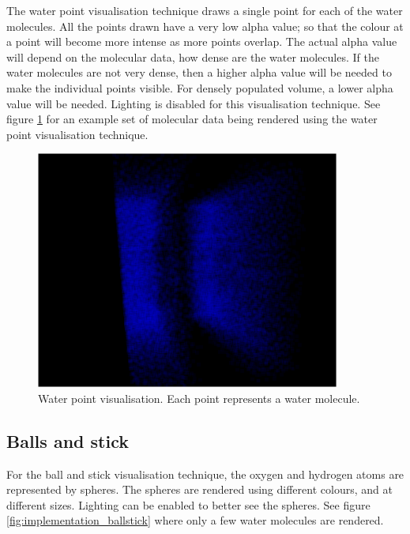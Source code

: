 The water point visualisation technique draws a single point for each of the
water molecules. All the points drawn have a very low alpha value; so that the
colour at a point will become more intense as more points overlap. The actual
alpha value will depend on the molecular data, how dense are the water
molecules. If the water molecules are not very dense, then a higher alpha value
will be needed to make the individual points visible. For densely populated
volume, a lower alpha value will be needed. Lighting is disabled for this
visualisation technique. See figure \ref{fig:implementation_waterpoint} for an
example set of molecular data being rendered using the water point
visualisation technique.

\begin{figure}[h!]
  \begin{center}
    \includegraphics[width=100mm]{waterpoint}
  \end{center}
  \caption{Water point visualisation. Each point represents a water molecule.}
  \label{fig:implementation_waterpoint}
\end{figure}


\subsection{Balls and stick}
\label{sub:implementation_ballstick}


For the ball and stick visualisation technique, the oxygen and hydrogen atoms
are represented by spheres. The spheres are rendered using different colours,
and at different sizes. Lighting can be enabled to better see the spheres. See
figure \ref{fig:implementation_ballstick} where only a few water molecules are
rendered.

